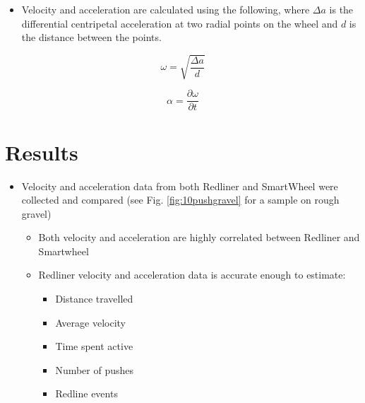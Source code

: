 \documentclass[a0,landscape]{a0poster}
\begin{document}
\begin{multicols*}{3}
\begin{itemize}
    \item Velocity and acceleration are calculated using the following, where $\Delta a$ is the differential centripetal acceleration at two radial points on the wheel and $d$ is the distance between the points.
\end{itemize}

\begin{minipage}{0.5\columnwidth}
    \[%
        \omega = \sqrt{\frac{\Delta a}{d}}
        \label{equ:velocity}
    \]%
\end{minipage}
%
\begin{minipage}{0.5\columnwidth}
    \[%
        \alpha = \frac{\partial \omega}{\partial t}
        \label{equ:acceleration}
    \]%
\end{minipage}

\section*{Results}
\begin{itemize}
    \item Velocity and acceleration data from both Redliner and SmartWheel were collected and compared (see Fig. \ref{fig:10pushgravel} for a sample on rough gravel)
    \begin{itemize}
        \item Both velocity and acceleration are highly correlated between Redliner and Smartwheel
        \item Redliner velocity and acceleration data is accurate enough to estimate:
        \begin{itemize}
            \item Distance travelled
            \item Average velocity
            \item Time spent active
            \item Number of pushes
            \item Redline events
        \end{itemize}
    \end{itemize}
\end{itemize}


\end{multicols*}
\end{document}

